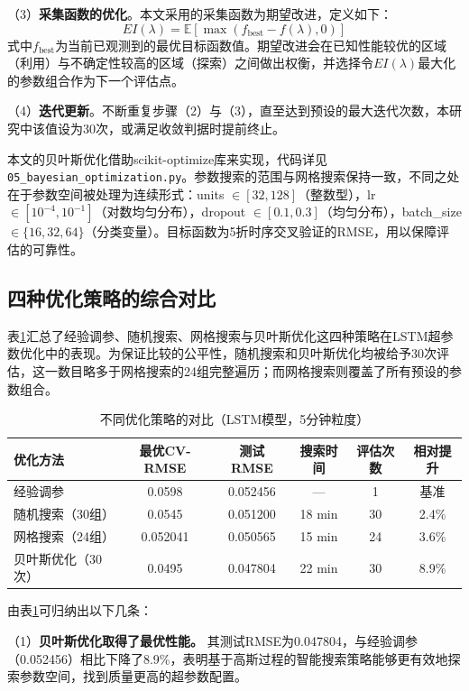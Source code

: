 \documentclass[12pt,a4paper,oneside]{ctexbook}
\begin{document}
	（3）\textbf{采集函数的优化}。本文采用的采集函数为期望改进，定义如下：
	\[
	EI(\lambda) = \mathbb{E}\left[\max(f_{\text{best}} - f(\lambda), 0)\right]
	\]
	式中$f_{\text{best}}$为当前已观测到的最优目标函数值。期望改进会在已知性能较优的区域（利用）与不确定性较高的区域（探索）之间做出权衡，并选择令$EI(\lambda)$最大化的参数组合作为下一个评估点。
	
	（4）\textbf{迭代更新}。不断重复步骤（2）与（3），直至达到预设的最大迭代次数，本研究中该值设为30次，或满足收敛判据时提前终止。
	
	本文的贝叶斯优化借助scikit-optimize库来实现，代码详见\texttt{05\_bayesian\_optimization.py}。参数搜索的范围与网格搜索保持一致，不同之处在于参数空间被处理为连续形式：units $\in [32,128]$（整数型），lr $\in [10^{-4}, 10^{-1}]$（对数均匀分布），dropout $\in [0.1, 0.3]$（均匀分布），batch\_size $\in \{16, 32, 64\}$（分类变量）。目标函数为5折时序交叉验证的RMSE，用以保障评估的可靠性。
	
	\subsection{四种优化策略的综合对比}
	
	表\ref{tab:opt_compare}汇总了经验调参、随机搜索、网格搜索与贝叶斯优化这四种策略在LSTM超参数优化中的表现。为保证比较的公平性，随机搜索和贝叶斯优化均被给予30次评估，这一数目略多于网格搜索的24组完整遍历；而网格搜索则覆盖了所有预设的参数组合。
	
	\begin{table}[H]
		\centering
		\caption{不同优化策略的对比（LSTM模型，5分钟粒度）}
		\label{tab:opt_compare}
		\begin{tabular}{lccccc}
			\toprule
			优化方法 & 最优CV-RMSE & 测试RMSE & 搜索时间 & 评估次数 & 相对提升 \\
			\midrule
			经验调参         & 0.0598 & 0.052456 & ---    & 1   & 基准 \\
			随机搜索（30组）   & 0.0545 & 0.051200 & 18 min & 30  & 2.4\% \\
			网格搜索（24组）   & 0.052041 & 0.050565 & 15 min & 24  & 3.6\% \\
			贝叶斯优化（30次） & 0.0495 & 0.047804 & 22 min & 30  & 8.9\% \\
			\bottomrule
		\end{tabular}
	\end{table}
	
	由表\ref{tab:opt_compare}可归纳出以下几条：
	
	（1）\textbf{贝叶斯优化取得了最优性能。} 其测试RMSE为0.047804，与经验调参（0.052456）相比下降了8.9\%，表明基于高斯过程的智能搜索策略能够更有效地探索参数空间，找到质量更高的超参数配置。
	
\end{document}
